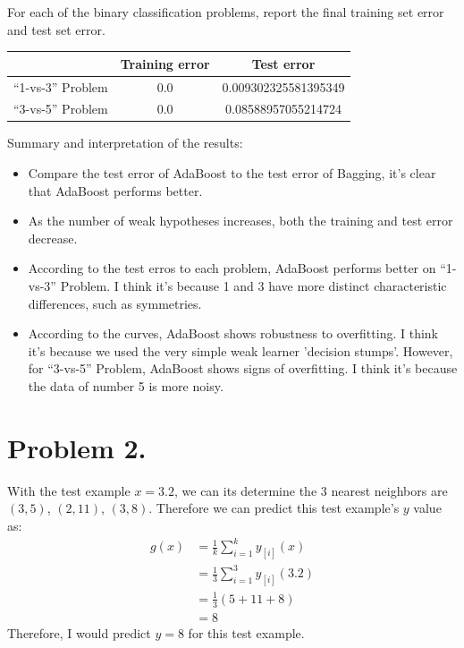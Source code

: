 \documentclass{article}
\begin{document}
    For each of the binary classification problems, report the final training set error and test set error.
    \begin{center}
        \begin{tabular}{|c|c|c|}
            \hline
            & Training error & Test error\\
            \hline
            ``1-vs-3'' Problem & 0.0 & 0.009302325581395349\\
            \hline
            ``3-vs-5'' Problem & 0.0 & 0.08588957055214724\\
            \hline
        \end{tabular}
    \end{center}
    Summary and interpretation of the results:
    \begin{itemize}
        \item Compare the test error of AdaBoost to the test error of Bagging, it's clear that AdaBoost
        performs better.
        \item As the number of weak hypotheses increases, both the training and test error decrease.
        \item According to the test erros to each problem, AdaBoost performs better on ``1-vs-3'' Problem. I think
        it's because 1 and 3 have more distinct characteristic differences, such as symmetries.
        \item According to the curves, AdaBoost shows robustness to overfitting. I think it's because we used
        the very simple weak learner 'decision stumps'. However, for ``3-vs-5'' Problem, AdaBoost shows signs of 
        overfitting. I think it's because the data of number 5 is more noisy.
    \end{itemize}

    \newpage
    \section*{Problem 2.}
    With the test example $x = 3.2$, we can its determine the 3 nearest neighbors are 
    $(3, 5)$, $(2,11)$, $(3,8)$. Therefore we can predict this test example's $y$ value as:
    \begin{align*}
        g(x) &= \frac{1}{k} \sum_{i = 1}^{k}y_{[i]}(x)\\
        &= \frac{1}{3} \sum_{i = 1}^{3}y_{[i]}(3.2)\\
        &= \frac{1}{3} (5 + 11 + 8)\\
        &= 8
    \end{align*}
    Therefore, I would predict $y = 8$ for this test example.
\end{document}
